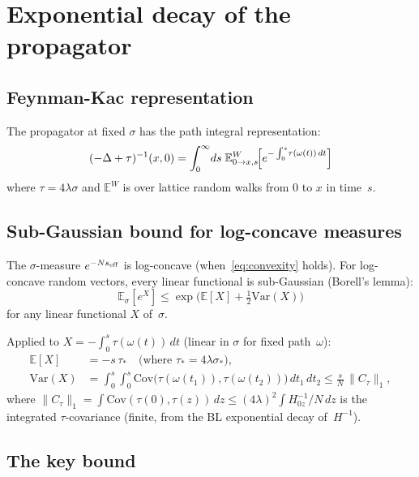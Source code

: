 \documentclass[12pt]{article}
\theoremstyle{definition}
\theoremstyle{remark}
\newcommand{\E}{\mathbb{E}}
\newcommand{\Var}{\mathrm{Var}}
\newcommand{\Cov}{\mathrm{Cov}}
\begin{document}
\section{Exponential decay of the propagator}

\subsection{Feynman-Kac representation}

The propagator at fixed $\sigma$ has the path integral
representation:
\begin{equation}
\label{eq:FK}
  (-\Delta+\tau)^{-1}(x,0)
    = \int_0^\infty\!ds\;\E^W_{0\to x,s}\!\Bigl[
      e^{-\int_0^s\!\tau(\omega(t))\,dt}\Bigr]
\end{equation}
where $\tau = 4\lambda\sigma$ and $\E^W$ is over lattice random
walks from $0$ to $x$ in time~$s$.

\subsection{Sub-Gaussian bound for log-concave measures}

The $\sigma$-measure $e^{-Ns_{\rm eff}}$ is log-concave
(when~\eqref{eq:convexity} holds). For log-concave random vectors,
every linear functional is sub-Gaussian (Borell's lemma):
\begin{equation}
\label{eq:subgauss}
  \E_\sigma[e^X] \le \exp\!\bigl(\E[X] + \tfrac{1}{2}\Var(X)\bigr)
\end{equation}
for any linear functional $X$ of~$\sigma$.

Applied to $X = -\int_0^s \tau(\omega(t))\,dt$ (linear in $\sigma$
for fixed path~$\omega$):
\begin{align}
  \E[X] &= -s\,\tau_* \quad\text{(where $\tau_* = 4\lambda\sigma_*$)},
    \label{eq:EX} \\
  \Var(X) &= \int_0^s\!\!\int_0^s\!
    \Cov\bigl(\tau(\omega(t_1)),\tau(\omega(t_2))\bigr)\,dt_1\,dt_2
    \le \frac{s}{N}\,\|C_\tau\|_1, \label{eq:VarX}
\end{align}
where $\|C_\tau\|_1 = \int\!\Cov(\tau(0),\tau(z))\,dz
\le (4\lambda)^2 \int\!H^{-1}_{0z}/N\,dz$ is the integrated
$\tau$-covariance (finite, from the BL exponential decay of~$H^{-1}$).

\subsection{The key bound}
\end{document}
